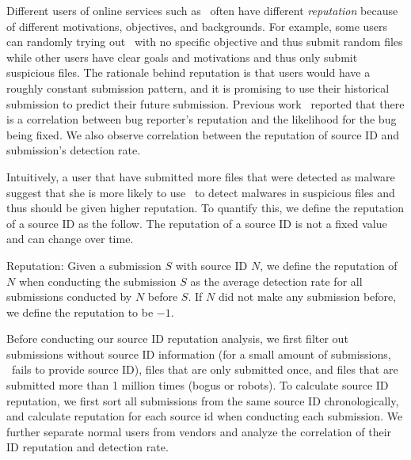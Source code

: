 
Different users of online services such as \vt\ often have different {\em reputation} 
because of different motivations, objectives, and backgrounds.
For example, some users can randomly trying out \vt\ with no specific objective and thus submit random files
while other users have clear goals and motivations and thus only submit suspicious files.
The rationale behind reputation is that \vt{} users would have a roughly constant submission pattern, 
and it is promising to use their historical submission to predict their future submission.
Previous work~\cite{GuoICSE2010} reported that there is a correlation between bug reporter’s reputation and the likelihood for the bug being fixed. 
We also observe correlation between the reputation of source ID and submission’s detection rate. 

Intuitively, a user that have submitted more files that were detected as malware suggest 
that she is more likely to use \vt\ to detect malwares in suspicious files 
and thus should be given higher reputation.
To quantify this, we define the reputation of a source ID as the follow.
The reputation of a source ID is not a fixed value and can change over time. 

\begin{definition}{Reputation:}
Given a submission $S$ with source ID $N$, 
we define the reputation of $N$ when conducting the submission $S$ as the average detection rate for all submissions conducted by $N$ before $S$. 
If $N$ did not make any submission before, we define the reputation to be $-1$. 
\end{definition}

Before conducting our source ID reputation analysis, we first filter out submissions without source ID information (for a small amount of submissions, \vt\ fails to provide source ID),
files that are only submitted once, and files that are submitted more than 1 million times (bogus or robots).
To calculate source ID reputation, we first sort all submissions from the same source ID chronologically, 
and calculate reputation for each source id when conducting each submission. 
We further separate normal users from vendors and analyze the correlation of their ID reputation and detection rate.

